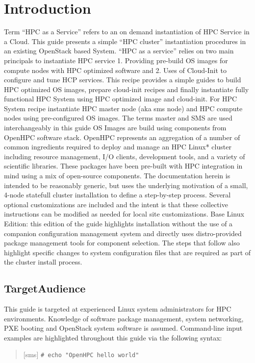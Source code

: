 \documentclass[12pt]{article}
\begin{document}
\newenvironment{bash}
{\begin{quote}
	}
	{ 
	\end{quote}
}

\section[]{Introduction}

Term “HPC as a Service” refers to an on demand instantiation of HPC Service in a Cloud. This guide presents a simple “HPC cluster” instantiation procedures in an existing OpenStack based System. “HPC as a service” relies on two main principals to instantiate HPC service 1. Providing pre-build OS images for compute nodes with HPC optimized software and 2. Uses of Cloud-Init to configure and tune HCP services. This recipe provides a simple guides to build HPC optimized OS images, prepare cloud-init recipes and finally instantiate fully functional HPC System using HPC optimized image and cloud-init. For HPC System recipe instantiate HPC master node (aka sms node) and HPC compute nodes using pre-configured OS images. The terms master and SMS are used interchangeably in this guide
OS Images are build using components from OpenHPC software stack. OpenHPC represents an aggregation of a number of common ingredients required to deploy and manage an HPC Linux* cluster including resource management, I/O clients, development tools, and a variety of scientific libraries. These packages have been pre-built with HPC integration in mind using a mix of open-source components. The documentation herein is intended to be reasonably generic,
but uses the underlying motivation of a small, 4-node statefull cluster installation to define a step-by-step
process. Several optional customizations are included and the intent is that these collective instructions can
be modified as needed for local site customizations.
Base Linux Edition: this edition of the guide highlights installation without the use of a companion configuration management system and directly uses distro-provided package management tools for component selection. The steps that follow also highlight specific changes to system configuration files that are required as part of the cluster install process.


\subsection*{TargetAudience}
This guide is targeted at experienced Linux system administrators for HPC environments. Knowledge of
software package management, system networking, PXE booting and OpenStack system software is assumed. Command-line input examples are highlighted throughout this guide via the following syntax:
\begin{bash}[sms] 
\texttt{\# echo "OpenHPC hello world"}
\end{bash}
\end{document}
